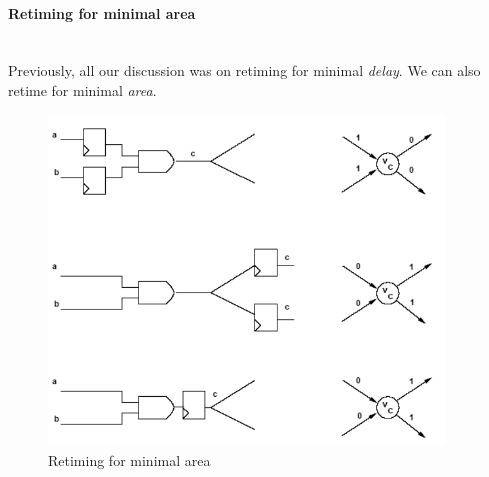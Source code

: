 \documentclass{article}
\begin{document}
\paragraph{Retiming for minimal area}\mbox{}\\
Previously, all our discussion was on retiming for minimal \textit{delay}. We can also retime for minimal \textit{area}.

\begin{figure}[htp]
    \centering
    \includegraphics[width=10.5cm, scale=1]{S2/retime_minArea.PNG}
    \caption{Retiming for minimal area}
\end{figure}
\end{document}
